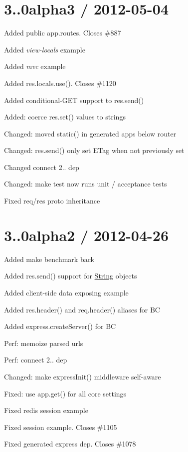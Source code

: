 \section*{3..\+0alpha3 / 2012-\/05-\/04 }


\begin{DoxyItemize}
\item Added public {\ttfamily app.\+routes}. Closes \#887
\item Added {\itshape view-\/locals} example
\item Added {\itshape mvc} example
\item Added {\ttfamily res.\+locals.\+use()}. Closes \#1120
\item Added conditional-\/\+G\+E\+T support to {\ttfamily res.\+send()}
\item Added\+: coerce {\ttfamily res.\+set()} values to strings
\item Changed\+: moved {\ttfamily static()} in generated apps below router
\item Changed\+: {\ttfamily res.\+send()} only set E\+Tag when not previously set
\item Changed connect 2.. dep
\item Changed\+: {\ttfamily make test} now runs unit / acceptance tests
\item Fixed req/res proto inheritance
\end{DoxyItemize}

\section*{3..\+0alpha2 / 2012-\/04-\/26 }


\begin{DoxyItemize}
\item Added {\ttfamily make benchmark} back
\item Added {\ttfamily res.\+send()} support for {\ttfamily \hyperlink{class_string}{String}} objects
\item Added client-\/side data exposing example
\item Added {\ttfamily res.\+header()} and {\ttfamily req.\+header()} aliases for B\+C
\item Added {\ttfamily express.\+create\+Server()} for B\+C
\item Perf\+: memoize parsed urls
\item Perf\+: connect 2.. dep
\item Changed\+: make {\ttfamily express\+Init()} middleware self-\/aware
\item Fixed\+: use app.\+get() for all core settings
\item Fixed redis session example
\item Fixed session example. Closes \#1105
\item Fixed generated express dep. Closes \#1078
\end{DoxyItemize}

